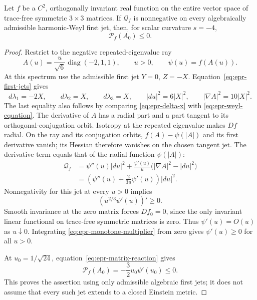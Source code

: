 \begin{proposition}
\label{prop:epr-global-multiplier}
Let $f$ be a $C^2$, orthogonally invariant real function on the entire
vector space of trace-free symmetric $3\times3$ matrices.  If
$\mathcal Q_f$ is nonnegative on every algebraically admissible
harmonic-Weyl first jet, then, for scalar curvature $s=-4$,
\[
 \mathcal P_f(A_0)\leq0.
\]
\end{proposition}

\begin{proof}
Restrict to the negative repeated-eigenvalue ray
\[
 A(u)=\frac{u}{\sqrt6}\operatorname{diag}(-2,1,1),
 \qquad u>0,\qquad \psi(u)=f(A(u)).
\]
At this spectrum use the admissible first jet $Y=0$, $Z=-X$.
Equation~\eqref{eq:epr-first-jets} gives
\[
 d\lambda_1=-2X,\qquad d\lambda_2=X,\qquad d\lambda_3=X,
 \qquad |du|^2=6|X|^2,
 \qquad |\nabla A|^2=10|X|^2.
\]
The last equality also follows by comparing
\eqref{eq:epr-delta-x} with \eqref{eq:epr-weyl-equation}.
The derivative of $A$ has a radial part and a part tangent to its
orthogonal-conjugation orbit.  Isotropy at the repeated eigenvalue
makes $Df$ radial.  On the ray and its conjugation orbits,
$f(A)-\psi(|A|)$ and its first derivative vanish; its Hessian
therefore vanishes on the chosen tangent jet.  The derivative term
equals that of the radial function $\psi(|A|)$:
\begin{align}
 \mathcal Q_f
 &=\psi''(u)|du|^2
       +\frac{\psi'(u)}{u}\bigl(|\nabla A|^2-|du|^2\bigr)
       \nonumber\\
 &=\left(\psi''(u)+\frac{2}{3u}\psi'(u)\right)|du|^2.
 \label{eq:epr-radial-derivative}
\end{align}
Nonnegativity for this jet at every $u>0$ implies
\begin{equation}\label{eq:epr-monotone-multiplier}
 (u^{2/3}\psi'(u))'\geq0.
\end{equation}
Smooth invariance at the zero matrix forces $Df_0=0$, since the
only invariant linear functional on trace-free symmetric matrices
is zero.  Thus $\psi'(u)=O(u)$ as $u\downarrow0$.
Integrating \eqref{eq:epr-monotone-multiplier} from zero gives
$\psi'(u)\geq0$ for all $u>0$.

At $u_0=1/\sqrt{24}$, equation~\eqref{eq:epr-matrix-reaction}
gives
\[
 \mathcal P_f(A_0)=-\frac32u_0\psi'(u_0)\leq0.
\]
This proves the assertion using only admissible algebraic first
jets; it does not assume that every such jet extends to a closed
Einstein metric.
\end{proof}

